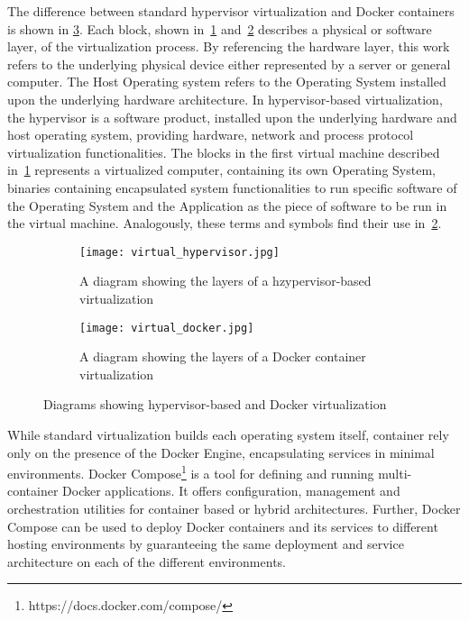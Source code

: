\documentclass[
a4paper,
twoside,
headsepline,
cleardoublepage=empty,
parskip=half,
draft=false
]{scrbook}
\begin{document}
			The difference between standard hypervisor virtualization and Docker containers is shown in \cref{fig:virtualization}.
			Each block, shown in~\cref{subfig:hypervisor} and~\cref{subfig:docker} describes a physical or software layer, of the virtualization process. 
			By referencing the hardware layer, this work refers to the underlying physical device either represented by a server or general computer. 
			The Host Operating system refers to the Operating System installed upon the underlying hardware architecture.
			In hypervisor-based virtualization, the hypervisor is a software product, installed upon the underlying hardware and host operating system, providing hardware, network and process protocol virtualization functionalities.
			The blocks in the first virtual machine described in~\cref{subfig:hypervisor} represents a virtualized computer, containing its own Operating System, binaries containing encapsulated system functionalities to run specific software of the Operating System and the Application as the piece of software to be run in the virtual machine.
			Analogously, these terms and symbols find their use in~\cref{subfig:docker}.
			
			\begin{figure}[H]
				\centering
				\begin{subfigure}{0.45\textwidth}
					\centering
					\texttt{[image: virtual\_hypervisor.jpg]}
					\caption{A diagram showing the layers of a hzypervisor-based virtualization}
					\label{subfig:hypervisor}
				\end{subfigure}
				\hfill
				\begin{subfigure}{0.45\textwidth}
					\centering
					\texttt{[image: virtual\_docker.jpg]}
					\caption{A diagram showing the layers of a Docker container virtualization}
					\label{subfig:docker}
				\end{subfigure}
				\caption{Diagrams showing hypervisor-based and Docker virtualization}
				\label{fig:virtualization}
			\end{figure}
			
			While standard virtualization builds each operating system itself, container rely only on the presence of the Docker Engine, encapsulating services in minimal environments.
			Docker Compose\footnote{https://docs.docker.com/compose/} is a tool for defining and running multi-container Docker applications. It offers configuration, management and orchestration utilities for container based or hybrid architectures. Further, Docker Compose can be used to deploy Docker containers and its services to different hosting environments by guaranteeing the same deployment and service architecture on each of the different environments.
\end{document}
